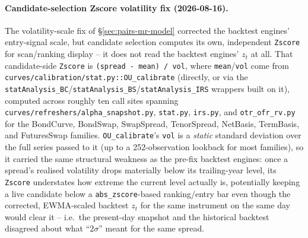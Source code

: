 \paragraph{Candidate-selection Zscore volatility fix (2026-08-16).} The
volatility-scale fix of \S\ref{sec:pairs-mr-model} corrected the backtest engines'
entry-signal scale, but candidate selection computes its own, independent
\texttt{Zscore} for scan/ranking display -- it does not read the backtest engines'
$z_t$ at all. That candidate-side \texttt{Zscore} is \texttt{(spread - mean) / vol},
where \texttt{mean}/\texttt{vol} come from
\texttt{curves/calibration/stat.py::OU\_calibrate} (directly, or via the
\texttt{statAnalysis\_BC}/\texttt{statAnalysis\_BS}/\texttt{statAnalysis\_IRS}
wrappers built on it), computed across roughly ten call sites spanning
\texttt{curves/refreshers/alpha\_snapshot.py}, \texttt{stat.py}, \texttt{irs.py}, and
\texttt{otr\_ofr\_rv.py} for the BondCurve, BondSwap, SwapSpread, TenorSpread,
NetBasis, TermBasis, and FuturesSwap families. \texttt{OU\_calibrate}'s \texttt{vol}
is a \emph{static} standard deviation over the full series passed to it (up to a
252-observation lookback for most families), so it carried the same structural
weakness as the pre-fix backtest engines: once a spread's realised volatility drops
materially below its trailing-year level, its \texttt{Zscore} understates how extreme
the current level actually is, potentially keeping a live candidate below a
\texttt{abs\_zscore}-based ranking/entry bar even though the corrected, EWMA-scaled
backtest $z_t$ for the same instrument on the same day would clear it -- i.e.\ the
present-day snapshot and the historical backtest disagreed about what ``$2\sigma$''
meant for the same spread.

